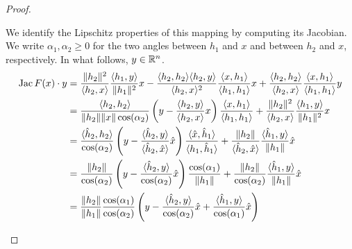 \documentclass[10pt,a4paper]{article}
\begin{document}
\begin{proof}
\begin{itemize}
        We identify the Lipschitz properties of this mapping by computing its Jacobian. 
        We write $\alpha_1, \alpha_2 \geq 0$ for the two angles between $h_1$ and $x$ and between $h_2$ and $x$, respectively. 
        In what follows, $y \in {\mathbb R}^{n}$.
        \begin{align*}
            \Jacobian F(x) \cdot y
            &=
            \frac{ \| h_2 \|^{2} }{ \langle h_2, x \rangle }
            \frac{ \langle h_1, y \rangle }{ \| h_1 \|^{2} }
            x
            - 
            \frac{ \langle h_2, h_2 \rangle \langle h_2, y \rangle }{ \langle h_2, x \rangle^{2} }
            \frac{ \langle x, h_1 \rangle }{ \langle h_1, h_1 \rangle }
            x 
            +
            \frac{ \langle h_2, h_2 \rangle }{ \langle h_2, x \rangle }
            \frac{ \langle x, h_1 \rangle }{ \langle h_1, h_1 \rangle }
            y 
            \\&=
            \frac{ \langle h_2, h_2 \rangle }{ \|h_2\| \|x\| \cos(\alpha_2) }
            \left( y - \frac{ \langle h_2, y \rangle }{ \langle h_2, x \rangle } x \right)
            \frac{ \langle x, h_1 \rangle }{ \langle h_1, h_1 \rangle }
            +
            \frac{ \| h_2 \|^{2} }{ \langle h_2, x \rangle }
            \frac{ \langle h_1, y \rangle }{ \| h_1 \|^{2} }
            x
            \\&=
            \frac{ \langle \hat h_2, h_2 \rangle }{ \cos(\alpha_2) }
            \left( y - \frac{ \langle \hat h_2, y \rangle }{ \langle \hat h_2, \hat x \rangle } \hat x \right)
            \frac{ \langle \hat x, \hat h_1 \rangle }{ \langle h_1, \hat h_1 \rangle }
            +
            \frac{ \| h_2 \| }{ \langle \hat h_2, \hat x \rangle }
            \frac{ \langle \hat h_1, y \rangle }{ \| h_1 \| }
            \hat x
            \\&=
            \frac{ \| h_2 \| }{ \cos(\alpha_2) }
            \left( y - \frac{ \langle \hat h_2, y \rangle }{ \cos(\alpha_2) } \hat x \right)
            \frac{ \cos(\alpha_1) }{ \| h_1 \| }
            +
            \frac{ \| h_2 \| }{ \cos(\alpha_2) }
            \frac{ \langle \hat h_1, y \rangle }{ \| h_1 \| }
            \hat x
            \\&=
            \frac{ \| h_2 \| }{ \| h_1 \| }
            \frac{ \cos(\alpha_1) }{ \cos(\alpha_2) }
            \left( 
                y 
                - 
                \frac{ \langle \hat h_2, y \rangle }{ \cos(\alpha_2) } \hat x 
                + 
                \frac{ \langle \hat h_1, y \rangle }{ \cos(\alpha_1) } \hat x 
            \right)

\end{align*}
\end{itemize}
\end{proof}
\end{document}

